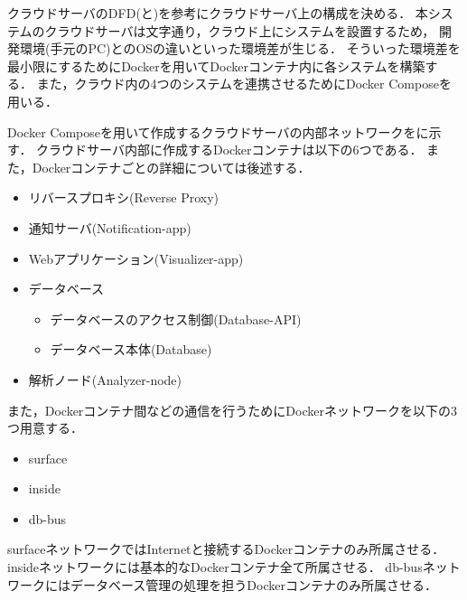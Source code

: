 \documentclass[12pt]{honka_v1}
\begin{document}


クラウドサーバのDFD(と)を参考にクラウドサーバ上の構成を決める．
本システムのクラウドサーバは文字通り，クラウド上にシステムを設置するため，
開発環境(手元のPC)とのOSの違いといった環境差が生じる．
そういった環境差を最小限にするためにDockerを用いてDockerコンテナ内に各システムを構築する．
また，クラウド内の4つのシステムを連携させるためにDocker Composeを用いる．

Docker Composeを用いて作成するクラウドサーバの内部ネットワークをに示す．
クラウドサーバ内部に作成するDockerコンテナは以下の6つである．
また，Dockerコンテナごとの詳細については後述する．
\begin{itemize}
    \item リバースプロキシ(Reverse Proxy)
    \item 通知サーバ(Notification-app)
    \item Webアプリケーション(Visualizer-app)
    \item データベース\begin{itemize}
        \item データベースのアクセス制御(Database-API)
        \item データベース本体(Database)
    \end{itemize}
    \item 解析ノード(Analyzer-node)
\end{itemize}

また，Dockerコンテナ間などの通信を行うためにDockerネットワークを以下の3つ用意する．
\begin{itemize}
    \item surface
    \item inside
    \item db-bus
\end{itemize}
surfaceネットワークではInternetと接続するDockerコンテナのみ所属させる．
insideネットワークには基本的なDockerコンテナ全て所属させる．
db-busネットワークにはデータベース管理の処理を担うDockerコンテナのみ所属させる．
\end{document}
